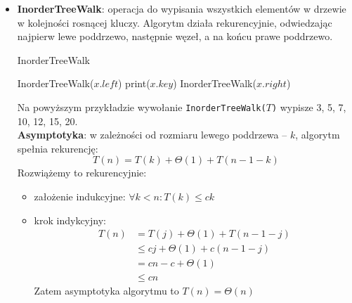\documentclass[11pt,a4paper]{article}
\begin{document}
\begin{itemize}
    \item \textbf{InorderTreeWalk}: operacja do wypisania wszystkich elementów w drzewie w kolejności rosnącej kluczy. Algorytm działa rekurencyjnie, odwiedzając najpierw lewe poddrzewo, następnie węzeł, a na końcu prawe poddrzewo. \\
        \begin{algorithm}
            \caption{InorderTreeWalk}
            \begin{algorithmic}[1]
                    \State InorderTreeWalk($x.left$)
                    \State print($x.key$)
                    \State InorderTreeWalk($x.right$)
                \EndIf
                \EndProcedure
            \end{algorithmic}
        \end{algorithm}
        Na powyższym przykładzie wywołanie \texttt{InorderTreeWalk($T$)} wypisze 3, 5, 7, 10, 12, 15, 20. \\
        \textbf{Asymptotyka}: w zależności od rozmiaru lewego poddrzewa -- $k$, algorytm spełnia rekurencję:
        \[
            T(n) = T(k) + \Theta(1) + T(n-1-k)
        \]
        Rozwiążemy to rekurencyjnie:
        \begin{itemize}
            \item założenie indukcyjne: $\forall k < n: T(k) \leq ck$
            \item krok indykcyjny:
                \begin{equation*}\begin{aligned}
                    T(n) &= T(j) + \Theta(1) + T(n-1-j)\\
                         &\leq cj + \Theta(1) +c(n-1-j) \\
                         &= cn -c +\Theta(1) \\
                         &\leq cn
                \end{aligned}\end{equation*}
                Zatem asymptotyka algorytmu to $T(n) = \Theta(n)$
        \end{itemize}


\end{itemize}
\end{document}
